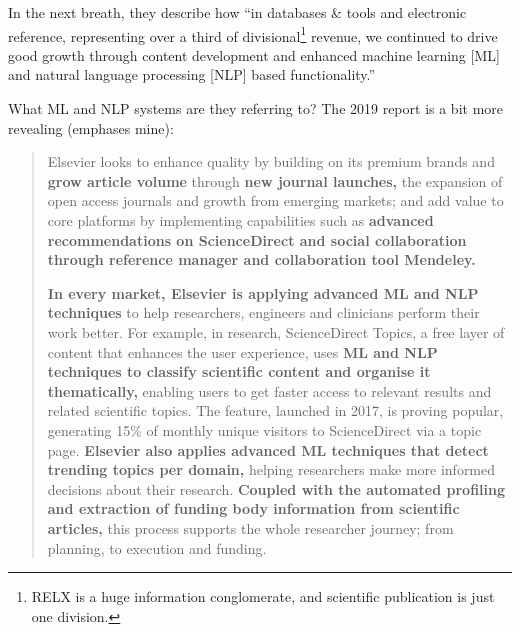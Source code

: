 In the next breath, they describe how ``in databases \& tools and
electronic reference, representing over a third of divisional\footnote{RELX
  is a huge information conglomerate, and scientific publication is just
  one division.} revenue, we continued to drive good growth through
content development and enhanced machine learning {[}ML{]} and natural
language processing {[}NLP{]} based functionality.''

What ML and NLP systems are they referring to? The 2019 report is a bit
more revealing (emphases mine):

\begin{quote}
Elsevier looks to enhance quality by building on its premium brands and
\textbf{grow article volume} through \textbf{new journal launches,} the
expansion of open access journals and growth from emerging markets; and
add value to core platforms by implementing capabilities such as
\textbf{advanced recommendations on ScienceDirect and social
collaboration through reference manager and collaboration tool
Mendeley.}

\textbf{In every market, Elsevier is applying advanced ML and NLP
techniques} to help researchers, engineers and clinicians perform their
work better. For example, in research, ScienceDirect Topics, a free
layer of content that enhances the user experience, uses \textbf{ML and
NLP techniques to classify scientific content and organise it
thematically,} enabling users to get faster access to relevant results
and related scientific topics. The feature, launched in 2017, is proving
popular, generating 15\% of monthly unique visitors to ScienceDirect via
a topic page. \textbf{Elsevier also applies advanced ML techniques that
detect trending topics per domain,} helping researchers make more
informed decisions about their research. \textbf{Coupled with the
automated profiling and extraction of funding body information from
scientific articles,} this process supports the whole researcher
journey; from planning, to execution and funding. \citep{RELXAnnualReport2019} 
\end{quote}


